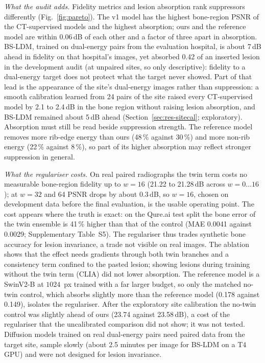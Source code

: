 \emph{What the audit adds.} Fidelity metrics and lesion absorption rank suppressors differently (Fig.~\ref{fig:pareto}). The v1 model has
the highest bone-region PSNR of the CT-supervised models and the highest absorption; ours and the reference model are within 0.06\,dB of
each other and a factor of three apart in absorption. BS-LDM, trained on dual-energy pairs from the evaluation hospital, is about 7\,dB ahead
in fidelity on that hospital's images, yet absorbed 0.42 of an inserted lesion in the development audit (at unpaired sites, so only
descriptive): fidelity to a dual-energy target does not protect what the target never showed. Part of that lead is the appearance of the
site's dual-energy images rather than suppression: a smooth calibration learned from 24 pairs of the site raised every CT-supervised model
by 2.1 to 2.4\,dB in the bone region without raising lesion absorption, and BS-LDM remained about 5\,dB ahead
(Section~\ref{sec:res-sitecal}; exploratory). Absorption must still be read beside suppression strength. The reference model removes more
rib-edge energy than ours (48\,\% against 30\,\%) and more non-rib energy (22\,\% against 8\,\%), so part of its higher absorption may
reflect stronger suppression in general.

\emph{What the regulariser costs.} On real paired radiographs the twin term costs no measurable bone-region fidelity up to $w=16$ (21.22 to
21.28\,dB across $w=0\ldots16$); at $w=32$ and 64 PSNR drops by about 0.3\,dB, so $w=16$, chosen on development data before the final
evaluation, is the usable operating point. The cost appears where the truth is exact: on the Qure.ai test split the bone error of the twin
ensemble is 41\,\% higher than that of the control (MAE 0.0041 against 0.0029; Supplementary Table~S5). The regulariser thus trades
synthetic bone accuracy for lesion invariance, a trade not visible on real images. The ablation shows that the effect needs gradients
through both twin branches and a consistency term confined to the pasted lesion; showing lesions during training without the twin term
(CLIA) did not lower absorption. The reference model is a SwinV2-B at $1024$~px trained with a far larger budget, so only the matched
no-twin control, which absorbs slightly more than the reference model (0.178 against 0.149), isolates the regulariser. After the
exploratory site calibration the no-twin control was slightly ahead of ours (23.74 against 23.58\,dB), a cost of the regulariser that the
uncalibrated comparison did not show; it was not tested. Diffusion models trained on real dual-energy pairs
\cite{sun2026bsldm,sun2026debonedit} need paired data from the target site, sample slowly (about 2.5 minutes per image for BS-LDM on a T4
GPU) and were not designed for lesion invariance.

